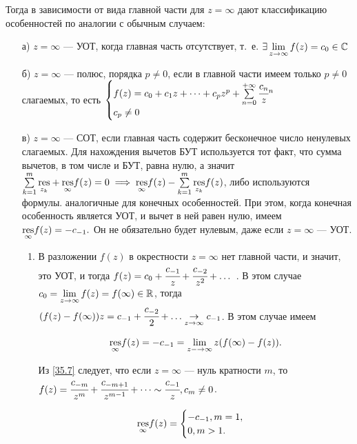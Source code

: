 \documentclass[../../main.tex]{subfiles}
\begin{document}
	 Тогда в зависимости от вида главной части для $z=\infty$ дают классификацию 
	 особенностей по аналогии с обычным случаем:
	 \begin{itemize}
	 	\item[а)] $z=\infty$ --- УОТ, когда главная часть отсутствует, т.~е.
	 	$\exists\lim\limits_{z\rightarrow \infty} f(z)=c_0\in \mathbb{C}$
	 	\item[б)] $z=\infty$ --- полюс, порядка $p\neq 0$, если в 
	 	главной части имеем только $p\neq 0$ слагаемых, то есть 
	 	$
	 	\begin{cases}
	 	f(z)=c_0+c_1z+\dots+c_pz^p+\sum\limits_{n=0}^{+\infty}\cfrac{c_n}
	 	z^n\\
	c_p\neq 0
	 	\end{cases}
	 	$ 
	 \item[в)] $z=\infty$ --- СОТ, если главная часть содержит бесконечное число 
	 ненулевых слагаемых. Для нахождения вычетов БУТ используется тот факт, что 
	 сумма вычетов, в том числе и БУТ, равна нулю, а значит 
	 $\sum\limits_{k=1}^m\underset{z_k}{\operatorname{res}}+\underset{\infty}{\operatorname{res}}f(z)=0 
	 \implies\underset{\infty}{\operatorname{res}}f(z)-\sum\limits_{k=1}^m 
	 \underset{z_k}{\operatorname{res}}f(z)$, либо используются формулы. аналогичные для 
	 конечных особенностей. При этом, когда конечная особенность является УОТ, и 
	 вычет в ней равен нулю, имеем 	$\underset{\infty}{\operatorname{res}}f(z)=-c_{-1}.$ Он не 
	 обязательно будет нулевым, даже если $z=\infty$ --- УОТ.
	 
	 \begin{enumerate}
	 	\item 
		В разложении $f(z)$ в окрестности $z=\infty$ нет главной части, и 
	 	значит, это УОТ, и тогда $f(z)=c_0+\cfrac{c_{-1}}{z}+\cfrac{c_{-2}}{z^2}+ 
	 	\dots$ . В этом случае 
	 	$c_0=\lim\limits_{z\rightarrow \infty}f(z)=f(\infty)\in \mathbb{R}$, тогда 
	 	$(f(z)-f(\infty))z=c_{-1}+\cfrac{c_{-2}}{2}+ 
	 	\dots\underset{z\rightarrow\infty}{\rightarrow}c_{-1}$. В этом случае имеем 
	 	
	 	\begin{equation}\label{35.7}
	 	\underset{\infty}{\operatorname{res}}f(z)=-c_{-1}= 
	 	\lim\limits_{z-\rightarrow\infty}z(f(\infty)-f(z)).
	 	\end{equation}
	 	
	 	Из \eqref{35.7} следует, что если $z=\infty$ --- нуль кратности $m$, то 
	 	$f(z)=\cfrac{c_{-m}}{z^m}+ \cfrac{c_{-m+1}}{z^{m-1}}+\dots\sim 
	 	\cfrac{c_{-1}}{z}, c_m\neq0$.
	 
	 	\[
	 	\underset{\infty}{\operatorname{res}}f(z)=
	 	\begin{cases}
	 		-c_{-1}, m=1,\\
	 		0, m>1.
	 	\end{cases}
	 	\]
	 	

\end{enumerate}
\end{itemize}
\end{document}
